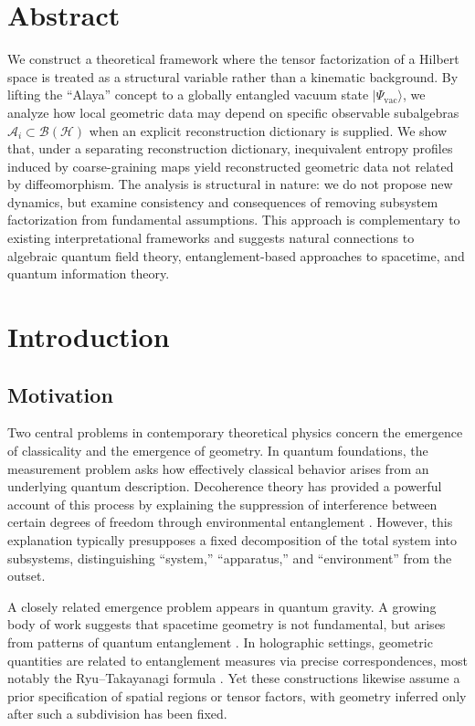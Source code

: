 \documentclass[12pt,a4paper,openany]{book}
\begin{document}
\section*{Abstract}
We construct a theoretical framework where the tensor factorization of a Hilbert space is treated as a structural variable rather than a kinematic background. 
By lifting the ``Alaya'' concept to a globally entangled vacuum state $|\Psi_{\text{vac}}\rangle$, we analyze how local geometric data may depend on specific observable subalgebras $\mathcal{A}_i \subset \mathcal{B}(\mathcal{H})$ when an explicit reconstruction dictionary is supplied. 
We show that, under a separating reconstruction dictionary, inequivalent entropy profiles induced by coarse-graining maps yield reconstructed geometric data not related by diffeomorphism.
The analysis is structural in nature: we do not propose new dynamics, but examine consistency and consequences of removing subsystem factorization from fundamental assumptions. 
This approach is complementary to existing interpretational frameworks and suggests natural connections to algebraic quantum field theory, entanglement-based approaches to spacetime, and quantum information theory.


\section{Introduction}

\subsection{Motivation}

Two central problems in contemporary theoretical physics concern the emergence of classicality and the emergence of geometry. 
In quantum foundations, the measurement problem asks how effectively classical behavior arises from an underlying quantum description. 
Decoherence theory has provided a powerful account of this process by explaining the suppression of interference between certain degrees of freedom through environmental entanglement \cite{Zurek2003}. 
However, this explanation typically presupposes a fixed decomposition of the total system into subsystems, distinguishing ``system,'' ``apparatus,'' and ``environment'' from the outset.

A closely related emergence problem appears in quantum gravity. 
A growing body of work suggests that spacetime geometry is not fundamental, but arises from patterns of quantum entanglement \cite{Maldacena1999,VanRaamsdonk2010}. 
In holographic settings, geometric quantities are related to entanglement measures via precise correspondences, most notably the Ryu--Takayanagi formula \cite{RyuTakayanagi2006}. 
Yet these constructions likewise assume a prior specification of spatial regions or tensor factors, with geometry inferred only after such a subdivision has been fixed.
\end{document}
